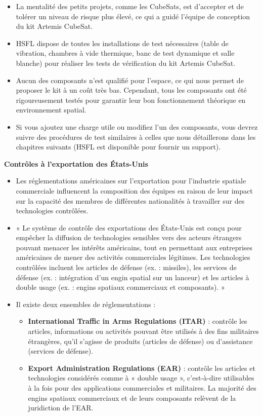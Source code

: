 \begin{itemize}
    \item La mentalité des petits projets, comme les CubeSats, est d’accepter et de tolérer un niveau de risque plus élevé, ce qui a guidé l’équipe de conception du kit Artemis CubeSat.  
    \item HSFL dispose de toutes les installations de test nécessaires (table de vibration, chambres à vide thermique, banc de test dynamique et salle blanche) pour réaliser les tests de vérification du kit Artemis CubeSat.  
    \item Aucun des composants n’est qualifié pour l’espace, ce qui nous permet de proposer le kit à un coût très bas. Cependant, tous les composants ont été rigoureusement testés pour garantir leur bon fonctionnement théorique en environnement spatial.  
    \item Si vous ajoutez une charge utile ou modifiez l’un des composants, vous devrez suivre des procédures de test similaires à celles que nous détaillerons dans les chapitres suivants (HSFL est disponible pour fournir un support).  
\end{itemize}

\textbf{Contrôles à l’exportation des États-Unis}

\begin{itemize}
    \item Les réglementations américaines sur l’exportation pour l’industrie spatiale commerciale influencent la composition des équipes en raison de leur impact sur la capacité des membres de différentes nationalités à travailler sur des technologies contrôlées.  
    \item « Le système de contrôle des exportations des États-Unis est conçu pour empêcher la diffusion de technologies sensibles vers des acteurs étrangers pouvant menacer les intérêts américains, tout en permettant aux entreprises américaines de mener des activités commerciales légitimes. Les technologies contrôlées incluent les articles de défense (ex. : missiles), les services de défense (ex. : intégration d’un engin spatial sur un lanceur) et les articles à double usage (ex. : engins spatiaux commerciaux et composants). »  
    \item Il existe deux ensembles de réglementations :  
    \begin{itemize}
        \item \textbf{International Traffic in Arms Regulations (ITAR)} : contrôle les articles, informations ou activités pouvant être utilisés à des fins militaires étrangères, qu’il s’agisse de produits (articles de défense) ou d’assistance (services de défense).  
        \item \textbf{Export Administration Regulations (EAR)} : contrôle les articles et technologies considérés comme à « double usage », c’est-à-dire utilisables à la fois pour des applications commerciales et militaires. La majorité des engins spatiaux commerciaux et de leurs composants relèvent de la juridiction de l’EAR.  
    \end{itemize}
\end{itemize}

